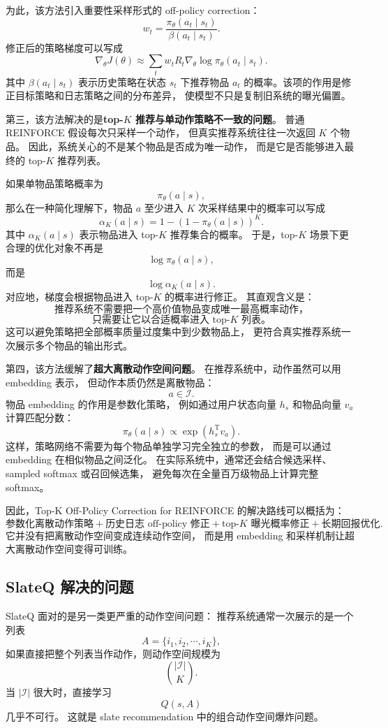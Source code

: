 \documentclass[11pt]{ctexart}
\begin{document}
为此，该方法引入重要性采样形式的 off-policy correction：
\[
w_t
=
\frac{
\pi_{\theta}(a_t\mid s_t)
}{
\beta(a_t\mid s_t)
}.
\]
修正后的策略梯度可以写成
\[
\nabla_{\theta}J(\theta)
\approx
\sum_t
w_t R_t
\nabla_{\theta}\log \pi_{\theta}(a_t\mid s_t).
\]
其中 $\beta(a_t\mid s_t)$ 表示历史策略在状态 $s_t$ 下推荐物品 $a_t$
的概率。该项的作用是修正目标策略和日志策略之间的分布差异，
使模型不只是复制旧系统的曝光偏置。

第三，该方法解决的是\textbf{top-$K$ 推荐与单动作策略不一致的问题}。
普通 REINFORCE 假设每次只采样一个动作，
但真实推荐系统往往一次返回 $K$ 个物品。
因此，系统关心的不是某个物品是否成为唯一动作，
而是它是否能够进入最终的 top-$K$ 推荐列表。

如果单物品策略概率为
\[
\pi_{\theta}(a\mid s),
\]
那么在一种简化理解下，物品 $a$ 至少进入 $K$ 次采样结果中的概率可以写成
\[
\alpha_K(a\mid s)
=
1-
\left(
1-\pi_{\theta}(a\mid s)
\right)^K.
\]
其中 $\alpha_K(a\mid s)$ 表示物品进入 top-$K$ 推荐集合的概率。
于是，top-$K$ 场景下更合理的优化对象不再是
\[
\log \pi_{\theta}(a\mid s),
\]
而是
\[
\log \alpha_K(a\mid s).
\]
对应地，梯度会根据物品进入 top-$K$ 的概率进行修正。
其直观含义是：
\[
\text{推荐系统不需要把一个高价值物品变成唯一最高概率动作，}
\]
\[
\text{只需要让它以合适概率进入 top-}K\text{ 列表。}
\]
这可以避免策略把全部概率质量过度集中到少数物品上，
更符合真实推荐系统一次展示多个物品的输出形式。

第四，该方法缓解了\textbf{超大离散动作空间问题}。
在推荐系统中，动作虽然可以用 embedding 表示，
但动作本质仍然是离散物品：
\[
a\in\mathcal{I}.
\]
物品 embedding 的作用是参数化策略，
例如通过用户状态向量 $h_s$ 和物品向量 $v_a$ 计算匹配分数：
\[
\pi_{\theta}(a\mid s)
\propto
\exp(h_s^{\mathrm{T}}v_a).
\]
这样，策略网络不需要为每个物品单独学习完全独立的参数，
而是可以通过 embedding 在相似物品之间泛化。
在实际系统中，通常还会结合候选采样、sampled softmax 或召回候选集，
避免每次在全量百万级物品上计算完整 softmax。

因此，Top-K Off-Policy Correction for REINFORCE 的解决路线可以概括为：
\[
\text{参数化离散动作策略}
+
\text{历史日志 off-policy 修正}
+
\text{top-}K\text{ 曝光概率修正}
+
\text{长期回报优化}.
\]
它并没有把离散动作空间变成连续动作空间，
而是用 embedding 和采样机制让超大离散动作空间变得可训练。

\subsection{SlateQ 解决的问题}

SlateQ 面对的是另一类更严重的动作空间问题：
推荐系统通常一次展示的是一个列表
\[
A=\{i_1,i_2,\cdots,i_K\},
\]
如果直接把整个列表当作动作，则动作空间规模为
\[
\binom{|\mathcal{I}|}{K}.
\]
当 $|\mathcal{I}|$ 很大时，直接学习
\[
Q(s,A)
\]
几乎不可行。
这就是 slate recommendation 中的组合动作空间爆炸问题。
\end{document}
